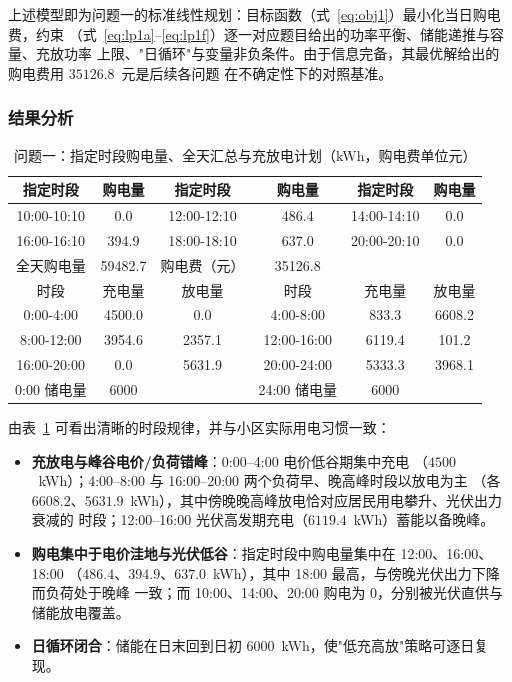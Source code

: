 \documentclass[withoutpreface]{cumcmthesis}
\begin{document}
上述模型即为问题一的标准线性规划：目标函数（式~\eqref{eq:obj1}）最小化当日购电费，约束
（式~\eqref{eq:lp1a}--\eqref{eq:lp1f}）逐一对应题目给出的功率平衡、储能递推与容量、充放功率
上限、"日循环"与变量非负条件。由于信息完备，其最优解给出的购电费用 $35126.8$~元是后续各问题
在不确定性下的对照基准。

\subsubsection{结果分析}
\begin{table}[H]
    \centering
    \caption{问题一：指定时段购电量、全天汇总与充放电计划（kWh，购电费单位元）}\label{tab:q1}
    \begin{tabular}{cc|cc|cc}
        \toprule[0.8pt]
        指定时段 & 购电量 & 指定时段 & 购电量 & 指定时段 & 购电量 \\
        \midrule[0.5pt]
        10:00-10:10 & 0.0 & 12:00-12:10 & 486.4 & 14:00-14:10 & 0.0 \\
        16:00-16:10 & 394.9 & 18:00-18:10 & 637.0 & 20:00-20:10 & 0.0 \\
        \midrule
        全天购电量 & 59482.7 & 购电费（元） & 35126.8 & & \\
        \midrule
        时段 & 充电量 & 放电量 & 时段 & 充电量 & 放电量 \\
        \midrule[0.5pt]
        0:00-4:00 & 4500.0 & 0.0 & 4:00-8:00 & 833.3 & 6608.2 \\
        8:00-12:00 & 3954.6 & 2357.1 & 12:00-16:00 & 6119.4 & 101.2 \\
        16:00-20:00 & 0.0 & 5631.9 & 20:00-24:00 & 5333.3 & 3968.1 \\
        \midrule
        0:00 储电量 & 6000 & & 24:00 储电量 & 6000 & \\
        \bottomrule[0.8pt]
    \end{tabular}
\end{table}
由表~\ref{tab:q1} 可看出清晰的时段规律，并与小区实际用电习惯一致：
\begin{itemize}
    \item \textbf{充放电与峰谷电价/负荷错峰}：0:00--4:00 电价低谷期集中充电
          （$4500$~kWh）；4:00--8:00 与 16:00--20:00 两个负荷早、晚高峰时段以放电为主
          （各 $6608.2$、$5631.9$~kWh），其中傍晚晚高峰放电恰对应居民用电攀升、光伏出力衰减的
          时段；12:00--16:00 光伏高发期充电（$6119.4$~kWh）蓄能以备晚峰。
    \item \textbf{购电集中于电价洼地与光伏低谷}：指定时段中购电量集中在 12:00、16:00、18:00
          （$486.4$、$394.9$、$637.0$~kWh），其中 18:00 最高，与傍晚光伏出力下降而负荷处于晚峰
          一致；而 10:00、14:00、20:00 购电为 0，分别被光伏直供与储能放电覆盖。
    \item \textbf{日循环闭合}：储能在日末回到日初 $6000$~kWh，使"低充高放"策略可逐日复现。
\end{itemize}
\end{document}
